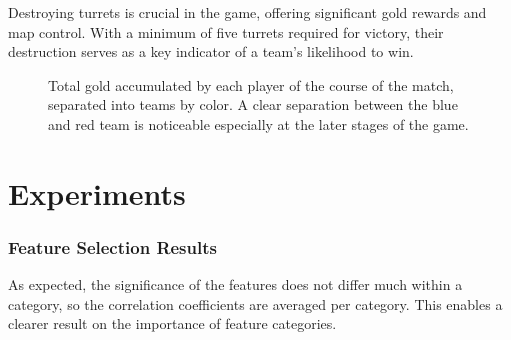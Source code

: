 \documentclass[12pt, a4paper, headinclude, twoside, plainheadsepline, open=right, numbers=noenddot, hidelinks, toc=listof, toc=bibliography]{scrreprt}
\begin{document}
Destroying turrets is crucial in the game, offering significant gold rewards and map control. 
With a minimum of five turrets required for victory, their destruction serves as a key indicator of a team's likelihood to win.

\begin{figure}

\caption{Total gold accumulated by each player of the course of the match, separated into teams by color. 
A clear separation between the blue and red team is noticeable especially at the later stages of the game.}
\label{fig:totalGold}
\end{figure}



\chapter{Experiments}
\label{chap:experiments}

\subsection{Feature Selection Results}
\label{ssec:feature_selection_results}


As expected, the significance of the features does not differ much within a category, so the correlation coefficients are averaged per category.
This enables a clearer result on the importance of feature categories.
\end{document}
